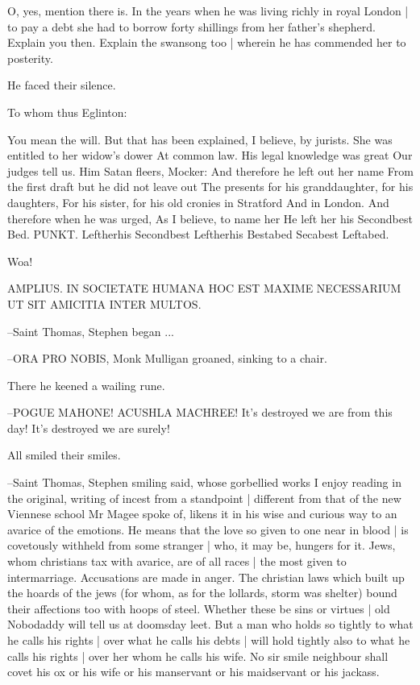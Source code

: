 O, yes,
mention there is.
In the years when he was living richly in royal London |
to pay a debt she had to borrow forty shillings from her father's shepherd.
Explain you then.
Explain the swansong too |
wherein he has commended her to posterity.

He faced their silence.

To whom thus Eglinton:


        You mean the will.
    But that has been explained, I believe, by jurists.
    She was entitled to her widow's dower
    At common law. His legal knowledge was great
    Our judges tell us.
        Him Satan fleers,
    Mocker:
        And therefore he left out her name
    From the first draft but he did not leave out
    The presents for his granddaughter, for his daughters,
    For his sister, for his old cronies in Stratford
    And in London. And therefore when he was urged,
    As I believe, to name her
    He left her his
    Secondbest
    Bed.
                PUNKT.
    Leftherhis
    Secondbest
    Leftherhis
    Bestabed
    Secabest
    Leftabed.


Woa!

AMPLIUS.
IN SOCIETATE HUMANA HOC EST MAXIME NECESSARIUM UT SIT AMICITIA INTER MULTOS.

--Saint Thomas,
Stephen began ...

--ORA PRO NOBIS,
Monk Mulligan groaned,
sinking to a chair.

There he keened a wailing rune.

--POGUE MAHONE!
ACUSHLA MACHREE!
It's destroyed we are from this day!
It's destroyed we are surely!

All smiled their smiles.

--Saint Thomas,
Stephen smiling said,
whose gorbellied works I enjoy reading in the original,
writing of incest from a standpoint |
different from that of the new Viennese school Mr Magee spoke of,
likens it in his wise and curious way to an avarice of the emotions.
He means that the love so given to one near in blood |
is covetously withheld from some stranger |
who,
it may be,
hungers for it.
Jews,
whom christians tax with avarice,
are of all races |
the most given to intermarriage.
Accusations are made in anger.
The christian laws which built up the hoards of the jews
(for whom, as for the lollards, storm was shelter)
bound their affections too with hoops of steel.
Whether these be sins or virtues |
old Nobodaddy will tell us at doomsday leet.
But a man who holds so tightly to what he calls his rights |
over what he calls his debts |
will hold tightly also to what he calls his rights |
over her whom he calls his wife.
No sir smile neighbour shall covet his ox
or his wife
or his manservant
or his maidservant
or his jackass.

